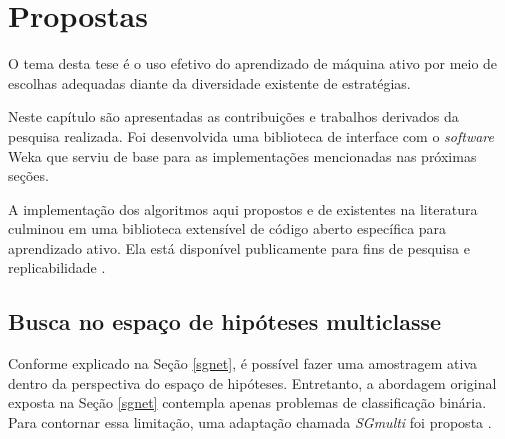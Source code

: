 \chapter{Propostas} \label{propostas}


O tema desta tese é o uso efetivo do aprendizado de máquina ativo por meio de escolhas
adequadas diante da diversidade existente de estratégias.



Neste capítulo são apresentadas as contribuições e trabalhos derivados da pesquisa
realizada.
Foi desenvolvida uma biblioteca \citep{doi/ml} de interface com o
\textit{software} Weka
que serviu de base para as implementações mencionadas nas próximas seções.



A implementação dos algoritmos aqui propostos e de existentes na literatura
culminou em uma biblioteca extensível de código aberto específica para aprendizado ativo.
Ela está disponível publicamente para fins de pesquisa e replicabilidade \citep{doi/al}.


\section{Busca no espaço de hipóteses multiclasse}
Conforme explicado na Seção \ref{sgnet},
é possível fazer uma amostragem ativa dentro
da perspectiva do espaço de hipóteses.
Entretanto, a abordagem original exposta na Seção \ref{sgnet}
contempla apenas problemas de classificação binária.
Para contornar essa limitação, uma adaptação chamada \textit{SGmulti}
foi proposta \citep{conf/hais/SantosC14}.


